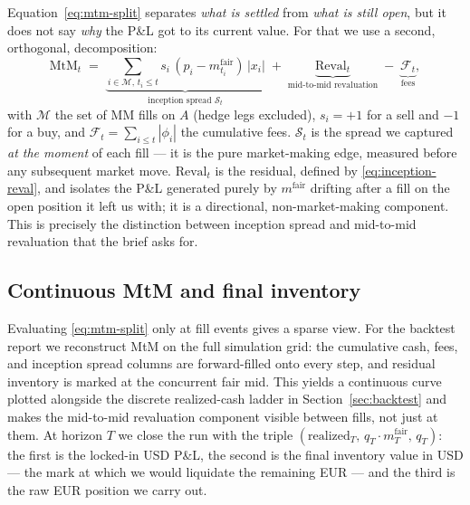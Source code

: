 Equation~\eqref{eq:mtm-split} separates \emph{what is settled} from
\emph{what is still open}, but it does not say \emph{why} the P\&L
got to its current value. For that we use a second, orthogonal,
decomposition:
\begin{equation}
  \mathrm{MtM}_t \;=\;
  \underbrace{\sum_{i \in \mathcal{M},\,t_i \le t} s_i\,(p_i - m^{\text{fair}}_{t_i})\,|x_i|}_{\text{inception spread } \mathcal{S}_t}
  \;+\;
  \underbrace{\mathrm{Reval}_t}_{\text{mid-to-mid revaluation}}
  \;-\;
  \underbrace{\mathcal{F}_t}_{\text{fees}},
  \label{eq:inception-reval}
\end{equation}
with $\mathcal{M}$ the set of MM fills on $A$ (hedge legs excluded),
$s_i = +1$ for a sell and $-1$ for a buy, and
$\mathcal{F}_t = \sum_{i \le t}|\phi_i|$ the cumulative fees.
$\mathcal{S}_t$ is the spread we captured \emph{at the moment} of
each fill --- it is the pure market-making edge, measured before any
subsequent market move. $\mathrm{Reval}_t$ is the residual, defined
by \eqref{eq:inception-reval}, and isolates the P\&L generated purely
by $m^{\text{fair}}$ drifting after a fill on the open position it
left us with; it is a directional, non-market-making component.
This is precisely the distinction between inception spread and
mid-to-mid revaluation that the brief asks for.

\subsection{Continuous MtM and final inventory}

Evaluating \eqref{eq:mtm-split} only at fill events gives a sparse
view. For the backtest report we reconstruct MtM on the full
simulation grid: the cumulative cash, fees, and inception spread
columns are forward-filled onto every step, and residual inventory
is marked at the concurrent fair mid. This yields a continuous curve
plotted alongside the discrete realized-cash ladder in
Section~\ref{sec:backtest} and makes the mid-to-mid revaluation
component visible between fills, not just at them. At horizon $T$ we
close the run with the triple $(\text{realized}_T,\, q_T \cdot m^{\text{fair}}_T,\, q_T)$:
the first is the locked-in USD P\&L, the second is the final
inventory value in USD --- the mark at which we would liquidate the
remaining EUR --- and the third is the raw EUR position we carry out.
